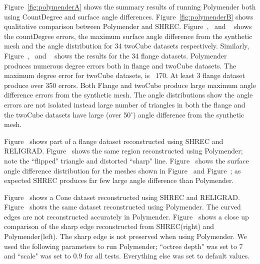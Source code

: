 Figure~\ref{fig:polymenderA} shows the summary results of running Polymender both using CountDegree and surface angle differences.
Figure~\ref{fig:polymenderB} shows qualitative comparison between Polymender and SHREC. 
Figure~\protect{},~\protect{} and ~\protect{} shows the countDegree errors, the maximum surface angle difference from the synthetic mesh and the angle distribution for 34 twoCube datasets respectively. Similarly, 
Figure~\protect{},~\protect{} and ~\protect{} shows the results for the 34 flange datasets. Polymender produces numerous degree errors both in flange and twoCube datasets. The maximum degree error for twoCube datasets, is ~170. At least 3 flange dataset produce over 350 errors. Both Flange and twoCube produce large maximum angle difference errors from the synthetic mesh. The angle distributions show the angle errors are not isolated instead large number of triangles in both the flange and the twoCube datasets have large (over 50$^\circ$) angle difference from the synthetic mesh.    

Figure~\protect{} shows part of a flange dataset reconstructed using SHREC and RELIGRAD. Figure~\protect{} shows the same region reconstructed using Polymender; note the ``flipped" triangle and distorted ``sharp" line. Figure~\protect{} shows the surface angle  difference distribution for the meshes shown in Figure~\protect{} and Figure~\protect{}; as expected SHREC produces far few large angle difference than Polymender.

Figure~\protect{} shows a Cone dataset reconstructed using SHREC and RELIGRAD. Figure~\protect{} shows the same dataset reconstructed using Polymender. The curved edges are not reconstructed accurately in Polymender. Figure~\protect{} shows a close up comparison of the sharp edge reconstructed from SHREC(right) and Polymender(left). The sharp edge is not preserved when using Polymender.  We used the following parameters to run Polymender; ``octree depth" was set to 7 and ``scale" was set to 0.9 for all tests. Everything else was set to default values. 

